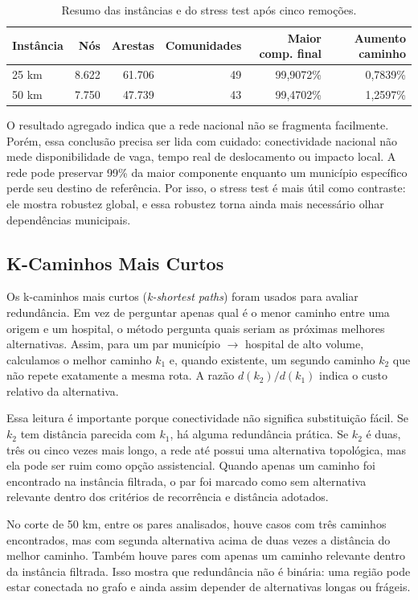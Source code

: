 \documentclass[10pt,a4paper]{article}
\begin{document}
\begin{table}[H]
\centering
\caption{Resumo das instâncias e do stress test após cinco remoções.}
\label{tab:instancias}
\begin{tabular}{lrrrrr}
\toprule
Instância & Nós & Arestas & Comunidades & Maior comp. final & Aumento caminho \\
\midrule
25 km & 8.622 & 61.706 & 49 & 99,9072\% & 0,7839\% \\
50 km & 7.750 & 47.739 & 43 & 99,4702\% & 1,2597\% \\
\bottomrule
\end{tabular}
\end{table}

O resultado agregado indica que a rede nacional não se fragmenta facilmente. Porém, essa conclusão precisa ser lida com cuidado: conectividade nacional não mede disponibilidade de vaga, tempo real de deslocamento ou impacto local. A rede pode preservar 99\% da maior componente enquanto um município específico perde seu destino de referência. Por isso, o stress test é mais útil como contraste: ele mostra robustez global, e essa robustez torna ainda mais necessário olhar dependências municipais.

\subsection{K-Caminhos Mais Curtos}

Os k-caminhos mais curtos (\textit{k-shortest paths}) foram usados para avaliar redundância. Em vez de perguntar apenas qual é o menor caminho entre uma origem e um hospital, o método pergunta quais seriam as próximas melhores alternativas. Assim, para um par município $\rightarrow$ hospital de alto volume, calculamos o melhor caminho $k_1$ e, quando existente, um segundo caminho $k_2$ que não repete exatamente a mesma rota. A razão $d(k_2)/d(k_1)$ indica o custo relativo da alternativa.

Essa leitura é importante porque conectividade não significa substituição fácil. Se $k_2$ tem distância parecida com $k_1$, há alguma redundância prática. Se $k_2$ é duas, três ou cinco vezes mais longo, a rede até possui uma alternativa topológica, mas ela pode ser ruim como opção assistencial. Quando apenas um caminho foi encontrado na instância filtrada, o par foi marcado como sem alternativa relevante dentro dos critérios de recorrência e distância adotados.

No corte de 50 km, entre os pares analisados, houve casos com três caminhos encontrados, mas com segunda alternativa acima de duas vezes a distância do melhor caminho. Também houve pares com apenas um caminho relevante dentro da instância filtrada. Isso mostra que redundância não é binária: uma região pode estar conectada no grafo e ainda assim depender de alternativas longas ou frágeis.
\end{document}
